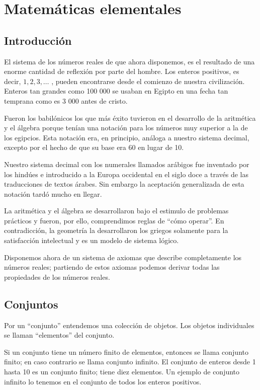 \chapter{Matemáticas elementales}
		
			
		\section{Introducción}
		
		El sistema de los números reales de que ahora disponemos, es el resultado de una enorme cantidad de reflexión por parte del hombre. Los enteros positivos, es decir, $1, 2, 3, \ldots $ , pueden encontrarse desde el comienzo de nuestra civilización. Enteros tan grandes como 100 000 se usaban en Egipto en una fecha tan temprana como es 3 000 antes de cristo. 
		
		Fueron los babilónicos los que más éxito tuvieron en el desarrollo de la aritmética y el álgebra porque tenían una notación para los números muy superior a la de los egipcios. Esta notación era, en principio, análoga a nuestro sistema decimal, excepto por el hecho de que su base era 60 en lugar de 10.
		
		Nuestro sistema decimal con los numerales llamados arábigos fue inventado por los hindúes e introducido a la Europa occidental en el siglo doce a través de las traducciones de textos árabes. Sin embargo la aceptación generalizada de esta notación tardó mucho en llegar.
		
		La aritmética y el álgebra se desarrollaron bajo el estimulo de problemas prácticos y fueron, por ello, comprendimos reglas de ``cómo operar''. En contradicción, la geometría la desarrollaron los griegos solamente para la satisfacción intelectual y es un modelo de sistema lógico.
		
		Disponemos ahora de un sistema de axiomas que describe completamente los números reales; partiendo de estos axiomas podemos derivar todas las propiedades de los números reales. \cite{haaser}
		
		\section{Conjuntos}
		
		Por un ``conjunto'' entendemos  una colección de objetos. Los objetos individuales se llaman ``elementos'' del conjunto.
		
		Si un conjunto tiene un número finito de elementos, entonces se llama conjunto finito; en caso contrario se llama conjunto infinito. El conjunto de enteros desde 1 hasta 10 es un conjunto finito; tiene diez elementos. Un ejemplo de conjunto infinito lo tenemos en el conjunto de todos los enteros positivos.
		
